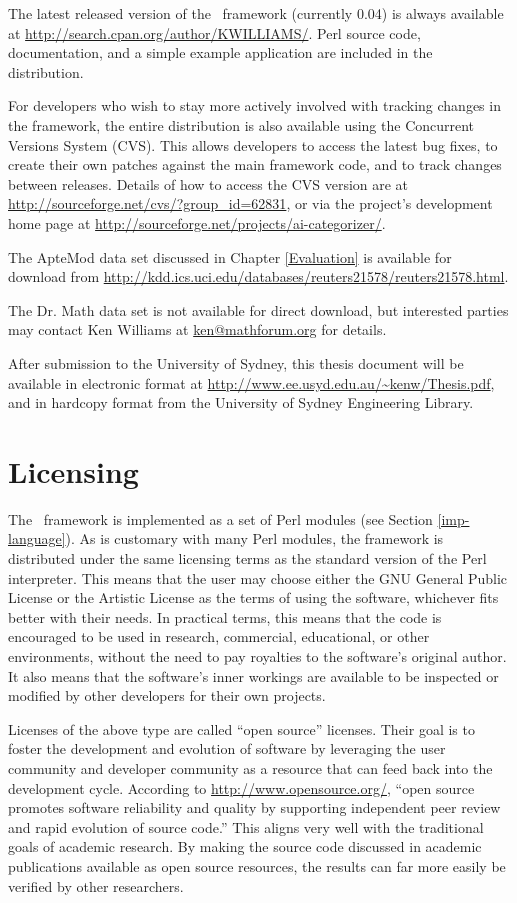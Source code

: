 The latest released version of the \aicat\ framework (currently 0.04)
is always available at
\url{http://search.cpan.org/author/KWILLIAMS/}.  Perl source code,
documentation, and a simple example application are included in the
distribution.

For developers who wish to stay more actively involved with tracking
changes in the framework, the entire distribution is also available
using the Concurrent Versions System (CVS).  This allows developers to
access the latest bug fixes, to create their own patches against the
main framework code, and to track changes between releases.  Details
of how to access the CVS version are at
\url{http://sourceforge.net/cvs/?group_id=62831}, or via the project's
development home page at
\url{http://sourceforge.net/projects/ai-categorizer/}.

The ApteMod data set discussed in Chapter \ref{Evaluation} is
available for download from
\url{http://kdd.ics.uci.edu/databases/reuters21578/reuters21578.html}.

The Dr. Math data set is not available for direct download, but
interested parties may contact Ken Williams at \url{ken@mathforum.org}
for details.

After submission to the University of Sydney, this thesis document
will be available in electronic format at
\url{http://www.ee.usyd.edu.au/~kenw/Thesis.pdf}, and in hardcopy
format from the University of Sydney Engineering Library.

\section*{Licensing}

The \aicat\ framework is implemented as a set of Perl modules (see
Section \ref{imp-language}).  As is customary with many Perl modules,
the framework is distributed under the same licensing terms as the
standard version of the Perl interpreter.  This means that the user
may choose either the GNU General Public License or the Artistic
License as the terms of using the software, whichever fits better with
their needs.  In practical terms, this means that the code is
encouraged to be used in research, commercial, educational, or other
environments, without the need to pay royalties to the software's
original author.  It also means that the software's inner workings are
available to be inspected or modified by other developers for their
own projects.

Licenses of the above type are called ``open source'' licenses.  Their
goal is to foster the development and evolution of software by
leveraging the user community and developer community as a resource
that can feed back into the development cycle.  According to
\url{http://www.opensource.org/}, ``open source promotes software
reliability and quality by supporting independent peer review and
rapid evolution of source code.''  This aligns very well with the
traditional goals of academic research.  By making the source code
discussed in academic publications available as open source resources, the
results can far more easily be verified by other researchers.


